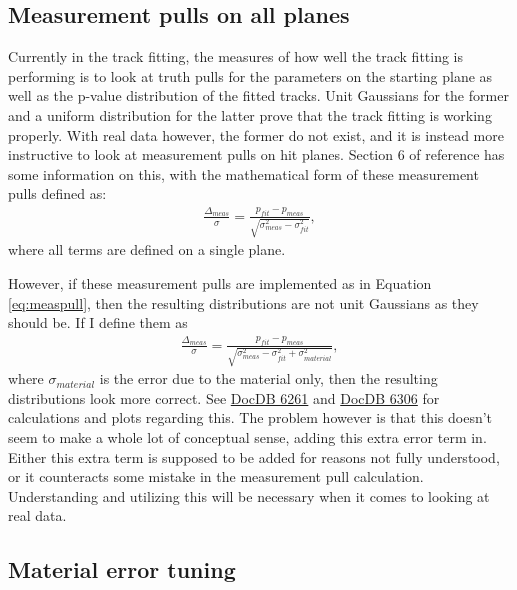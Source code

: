 	\subsection{Measurement pulls on all planes}

		Currently in the track fitting, the measures of how well the track fitting is performing is to look at truth pulls for the parameters on the starting plane as well as the p-value distribution of the fitted tracks. Unit Gaussians for the former and a uniform distribution for the latter prove that the track fitting is working properly. With real data however, the former do not exist, and it is instead more instructive to look at measurement pulls on hit planes. Section 6 of reference \cite{trajfit} has some information on this, with the mathematical form of these measurement pulls defined as:
		\begin{align} \label{eq:measpull}
            \frac{\Delta_{meas}}{\sigma} = \frac{p_{fit} - p_{meas}}{\sqrt{\sigma^{2}_{meas} - \sigma^{2}_{fit}}},
        \end{align}
        where all terms are defined on a single plane.

        However, if these measurement pulls are implemented as in Equation \ref{eq:measpull}, then the resulting distributions are not unit Gaussians as they should be. If I define them as 
        \begin{align} \label{eq:measpullmaterial}
            \frac{\Delta_{meas}}{\sigma} = \frac{p_{fit} - p_{meas}}{\sqrt{\sigma^{2}_{meas} - \sigma^{2}_{fit} + \sigma^{2}_{material}}},
        \end{align}
        where $\sigma_{material}$ is the error due to the material only, then the resulting distributions look more correct. See \href{https://gm2-docdb.fnal.gov/cgi-bin/private/ShowDocument?docid=6261}{DocDB 6261} and \href{https://gm2-docdb.fnal.gov/cgi-bin/private/ShowDocument?docid=6306}{DocDB 6306} for calculations and plots regarding this. The problem however is that this doesn't seem to make a whole lot of conceptual sense, adding this extra error term in. Either this extra term is supposed to be added for reasons not fully understood, or it counteracts some mistake in the measurement pull calculation. Understanding and utilizing this will be necessary when it comes to looking at real data.

	\subsection{Material error tuning}


